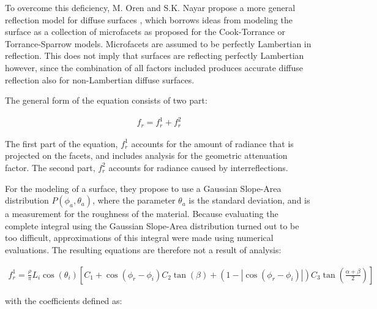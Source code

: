 To overcome this deficiency, M. Oren and S.K. Nayar propose a more general reflection model for diffuse surfaces \cite{OrenNayar} \cite{ImprovedDiffuse}, which borrows ideas from modeling the surface as a collection of microfacets as proposed for the Cook-Torrance or Torrance-Sparrow models. Microfacets are assumed to be perfectly Lambertian in reflection. This does not imply that surfaces are reflecting perfectly Lambertian however, since the combination of all factors included produces accurate diffuse reflection also for non-Lambertian diffuse surfaces. 

The general form of the equation consists of two part:

	\begin{eqnarray*}
		f_r = f_r^1 + f_r^2
	\end{eqnarray*}

\noindent The first part of the equation, $f_r^1$ accounts for the amount of radiance that is projected on the facets, and includes analysis for the geometric attenuation factor. The second part, $f_r^2$ accounts for radiance caused by interreflections.


For the modeling of a surface, they propose to use a Gaussian Slope-Area distribution $P(\phi_a, \theta_a)$, where the parameter $\theta_a$ is the standard deviation, and is a measurement for the roughness of the material. Because evaluating the complete integral using the Gaussian Slope-Area distribution turned out to be too difficult, approximations of this integral were made using numerical evaluations. The resulting equations are therefore not a result of analysis: 


	\begin{eqnarray*}
		f_r^1 = \frac{\rho}{\pi}L_i\cos(\theta_i)\left[C_1+\cos(\phi_r-\phi_i)C_2\tan(\beta) 
			  + (1-|\cos(\phi_r-\phi_i)|)C_3\tan\left(\frac{\alpha+\beta}{2}\right)\right]
	\end{eqnarray*}

\noindent with the coefficients defined as:

